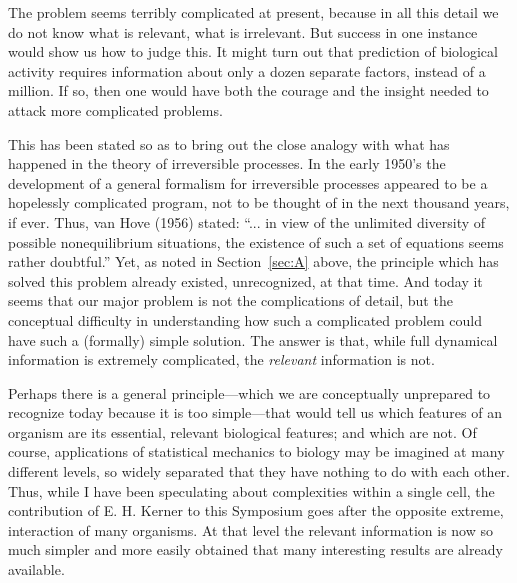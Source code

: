 {The problem seems terribly complicated at present, because in all this detail we do not know what is relevant, what is irrelevant.
But success in one instance would show us how to judge this.
It might turn out that prediction of biological activity requires information about only a dozen separate factors, instead of a million.
If so, then one would have both the courage and the insight needed to attack more complicated problems.

This has been stated so as to bring out the close analogy with what has happened in the theory of irreversible processes.
In the early 1950's the development of a general formalism for irreversible processes appeared to be a hopelessly complicated program, not to be thought of in the next thousand years, if ever.
Thus, van Hove (1956) stated: ``... in view of the unlimited diversity of possible nonequilibrium situations, the existence of such a set of equations seems rather doubtful.''
Yet, as noted in Section~\ref{sec:A} above, the principle which has solved this problem already existed, unrecognized, at that time.
And today it seems that our major problem is not the complications of detail, but the conceptual difficulty in understanding how such a complicated problem could have such a (formally) simple solution.
The answer is that, while full dynamical information is extremely complicated, the \emph{relevant} information is not.

Perhaps there is a general principle---which we are conceptually unprepared to recognize today because it is too simple---that would tell us which features of an organism are its essential, relevant biological features; and which are not.
Of course, applications of statistical mechanics to biology may be imagined at many different levels, so widely separated that they have nothing to do with each other.
Thus, while I have been speculating about complexities within a single cell, the contribution of E. H. Kerner to this Symposium goes after the opposite extreme, interaction of many organisms.
At that level the relevant information is now so much simpler and more easily obtained that many interesting results are already available.

}
